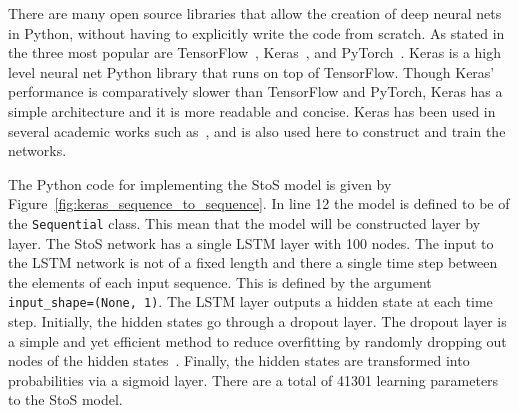 There are many open source libraries that allow the creation of deep neural nets
in Python, without having to explicitly write the code from scratch. As stated
in~\cite{Vasilev2019} the three most popular are
TensorFlow~\cite{TensorFlow2015}, Keras~\cite{Chollet2015}, and
PyTorch~\cite{pytorch}. Keras is a high level neural net Python library that
runs on top of TensorFlow. Though Keras' performance is comparatively slower
than TensorFlow and PyTorch, Keras has a simple architecture and it is more
readable and concise. Keras has been used in several academic works such
as~\cite{Barbastathis2019, Mei2018, Soffer2019}, and is also used here to
construct and train the networks.

The Python code for implementing the StoS model is given by
Figure~\ref{fig:keras_sequence_to_sequence}. In line 12 the model is defined to
be of the \texttt{Sequential} class. This mean that the model will
be constructed layer by layer. The StoS network has a single LSTM layer with 100
nodes. The input to the LSTM network is not of a fixed length and there a single
time step between the elements of each input sequence. This is defined by the
argument \texttt{input_shape=(None, 1)}. The LSTM layer outputs a
hidden state at each time step. Initially, the hidden states go through a
dropout layer. The dropout layer is a simple and yet efficient method to reduce
overfitting by randomly dropping out nodes of the hidden
states~\cite{Baldi2013}. Finally, the hidden states are transformed into
probabilities via a sigmoid layer. There are a total of 41301 learning
parameters to the StoS model.

